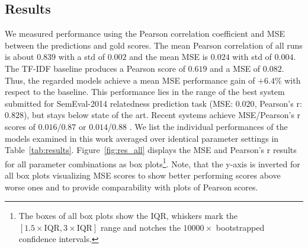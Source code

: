 \subsection{Results}
We measured performance using the Pearson correlation coefficient and \ac{MSE} between the predictions and gold scores. The mean Pearson correlation of all runs is about $0.839$ with a \ac{std} of $0.002$ and the mean \ac{MSE} is $0.024$ with std of $0.004$. The \ac{TF-IDF} baseline produces a Pearson score of $0.619$ and a \ac{MSE} of $0.082$. Thus, the regarded models achieve a mean \ac{MSE} performance gain of $+6.4\%$ with respect to the baseline. This performance lies in the range of the best system submitted for SemEval-2014 relatedness prediction task (MSE: $0.020$, Pearson's r: $0.828$), but stays below state of the art. Recent systems achieve MSE/Pearson's r scores of $0.016$/$0.87$ \autocite{he_multi-perspective_2015} or $0.014$/$0.88$ \autocite{mueller_siamese_2016}. We list the individual performances of the models examined in this work averaged over identical parameter settings in Table~\ref{tab:results}. Figure~\ref{fig:res_all} displays the \ac{MSE} and Pearson's r results for all parameter combinations as box plots\footnote{The boxes of all box plots show the \ac{IQR}, whiskers mark the $[1.5\times \text{IQR}, 3\times \text{IQR}]$ range and notches the  $10000\times$ bootstrapped confidence intervals.}. Note, that the y-axis is inverted for all box plots visualizing \ac{MSE} scores to show better performing scores above worse ones and to provide comparability with plots of Pearson scores. 




